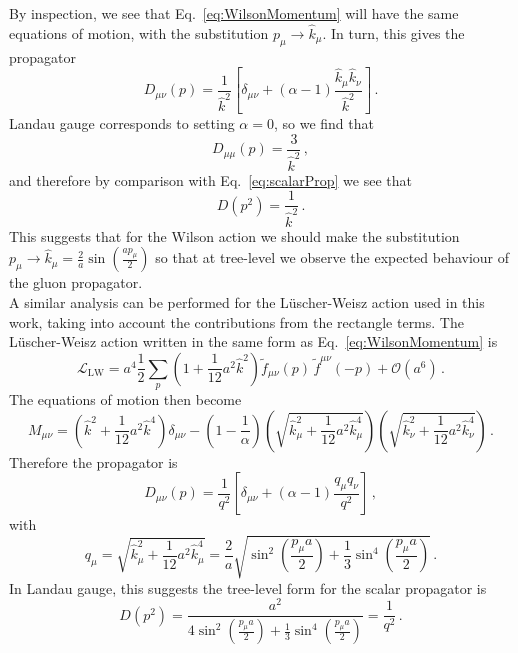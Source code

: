%
By inspection, we see that Eq.~\ref{eq:WilsonMomentum} will have the same equations of motion, with the substitution $p_\mu\rightarrow \hat{k}_\mu$. In turn, this gives the propagator
%
\begin{equation}
D_{\mu\nu}(p) = \frac{1}{\hat{k}^2}\left[\delta_{\mu\nu} + (\alpha-1)\frac{\hat{k}_\mu \hat{k}_\nu}{\hat{k}^2}\right]\, .
\end{equation}
Landau gauge corresponds to setting $\alpha=0$, so we find that
%
\begin{equation}
D_{\mu\mu}(p) = \frac{3}{\hat{k}^2}\, ,
\end{equation}
%
and therefore by comparison with Eq.~\ref{eq:scalarProp} we see that
%
\begin{equation}
D(p^2) = \frac{1}{\hat{k}^2}\, .
\end{equation}
%
This suggests that for the Wilson action we should make the substitution $p_\mu\rightarrow \hat{k}_\mu = \frac{2}{a}\sin\left(\frac{a p_\mu}{2}\right)$ so that at tree-level we observe the expected behaviour of the gluon propagator.\\

A similar analysis can be performed for the L\"uscher-Weisz action used in this work, taking into account the contributions from the rectangle terms. The L\"uscher-Weisz action written in the same form as Eq.~\ref{eq:WilsonMomentum} is~\cite{Weisz:1982zw}
%
\begin{equation}
\mathcal{L}_\text{LW} = a^4\frac{1}{2}\sum_p \left(1+\frac{1}{12}a^2\hat{k}^2\right) \tilde{f}_{\mu\nu}(p) \, \tilde{f}^{\mu\nu}(-p) + \mathcal{O}(a^6)\, .
\end{equation}
%
The equations of motion then become
%
\begin{equation}
M_{\mu\nu} = \left(\hat{k}^2 + \frac{1}{12}a^2\hat{k}^4\right)\delta_{\mu\nu} - \left(1-\frac{1}{\alpha}\right)\left(\sqrt{\hat{k}_\mu^2 + \frac{1}{12}a^2\hat{k}_\mu^4}\right)\left(\sqrt{\hat{k}_\nu^2 + \frac{1}{12}a^2\hat{k}_\nu^4}\right)\, .
\end{equation}
Therefore the propagator is
%
\begin{equation}
D_{\mu\nu}(p) = \frac{1}{q^2}\left[\delta_{\mu\nu} + (\alpha-1)\frac{q_\mu q_\nu}{q^2}\right]\, ,
\end{equation}
with
\begin{equation}
q_\mu = \sqrt{\hat{k}_\mu^2 + \frac{1}{12}a^2\hat{k}_\mu^4} = \frac{2}{a}\sqrt { \sin ^ { 2 } \left( \frac { p _ { \mu } a } { 2 } \right) + \frac { 1 } { 3 } \sin ^ { 4 } \left( \frac { p _ { \mu } a } { 2 } \right) }\, .
\end{equation}
%
In Landau gauge, this suggests the tree-level form for the scalar propagator is
%
\begin{equation}
D(p^2) = \frac{a^2}{4 \sin ^ { 2 } \left( \frac { p _ { \mu } a } { 2 } \right) + \frac { 1 } { 3 } \sin ^ { 4 } \left( \frac { p _ { \mu } a } { 2 } \right)} = \frac{1}{q^2}\, .
\label{eq:LWCorrection}
\end{equation}\\

